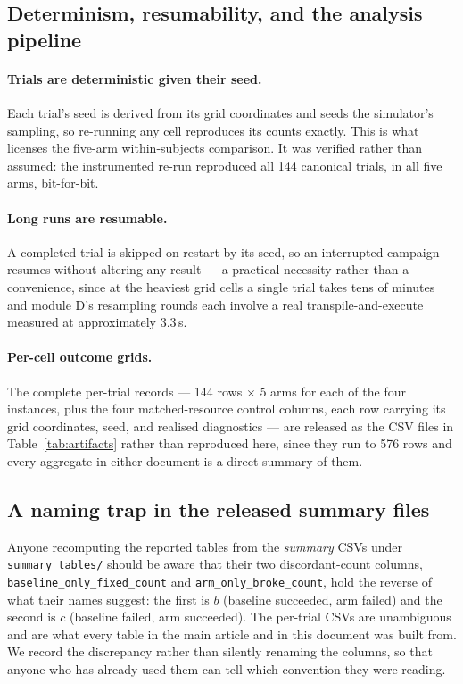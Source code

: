 \documentclass[preprint,11pt]{elsarticle}
\begin{document}
\subsection{Determinism, resumability, and the analysis pipeline}

\paragraph{Trials are deterministic given their seed.} Each trial's seed
is derived from its grid coordinates and seeds the simulator's sampling,
so re-running any cell reproduces its counts exactly. This is what
licenses the five-arm within-subjects comparison. It was verified rather
than assumed: the instrumented re-run reproduced all 144 canonical
trials, in all five arms, bit-for-bit.

\paragraph{Long runs are resumable.} A completed trial is skipped on
restart by its seed, so an interrupted campaign resumes without altering
any result --- a practical necessity rather than a convenience, since at
the heaviest grid cells a single trial takes tens of minutes and module
D's resampling rounds each involve a real transpile-and-execute measured
at approximately $3.3$\,s.

\paragraph{Per-cell outcome grids.} The complete per-trial records --- 144
rows $\times$ 5 arms for each of the four instances, plus the four
matched-resource control columns, each row carrying its grid coordinates,
seed, and realised diagnostics --- are released as the CSV files in
Table~\ref{tab:artifacts} rather than reproduced here, since they run to
576 rows and every aggregate in either document is a direct summary of
them.

\subsection{A naming trap in the released summary files}

Anyone recomputing the reported tables from the \emph{summary} CSVs under
\texttt{summary\_tables/} should be aware that their two discordant-count
columns, \texttt{baseline\_only\_fixed\_count} and
\texttt{arm\_only\_broke\_count}, hold the reverse of what their names
suggest: the first is $b$ (baseline succeeded, arm failed) and the second
is $c$ (baseline failed, arm succeeded). The per-trial CSVs are
unambiguous and are what every table in the main article and in this
document was built from. We record the discrepancy rather than silently
renaming the columns, so that anyone who has already used them can tell
which convention they were reading.



\end{document}
